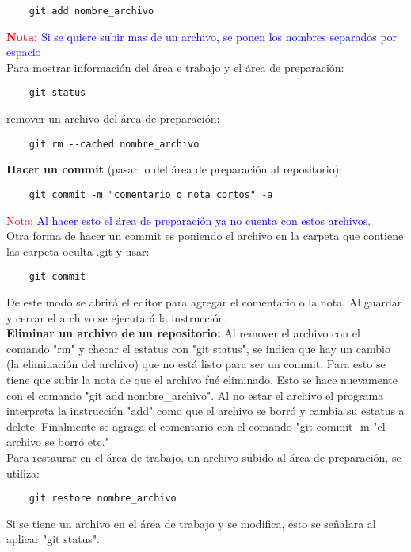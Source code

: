 \documentclass[10pt,oneside]{article}
\begin{document}
\begin{multicols}{2}
\begin{verbatim}
    git add nombre_archivo
\end{verbatim}
\textbf{\textcolor{red}{Nota:}} \textcolor{blue}{Si se quiere subir mas de un archivo, se ponen los nombres separados por espacio}\\ \newline
Para mostrar información del área e trabajo y el área de preparación:
\begin{verbatim}
    git status
\end{verbatim}
remover un archivo del área de preparación:
\begin{verbatim}
    git rm --cached nombre_archivo
\end{verbatim}
\textbf{Hacer un commit} (pasar lo del área de preparación al repositorio):
\begin{verbatim}
    git commit -m "comentario o nota cortos" -a
\end{verbatim}
\textcolor{red}{Nota:} \textcolor{blue}{Al hacer esto el área de preparación ya no cuenta con estos archivos.} \\ \newline
Otra forma de hacer un commit es poniendo el archivo en la carpeta que contiene las carpeta oculta .git y usar:
\begin{verbatim}
    git commit
\end{verbatim}
De este modo se abrirá el editor para agregar el comentario o la nota. Al guardar y cerrar el archivo se ejecutará la instrucción. \\\newline
\textbf{Eliminar un archivo de un repositorio:} Al remover el archivo con el comando "rm" y checar el estatus con "git status", se indica que hay un cambio (la eliminación del archivo) que no está listo para ser un commit. Para esto se tiene que subir la nota de que el archivo fué eliminado. Esto se hace nuevamente con el comando "git add nombre\_archivo". Al no estar el archivo el programa interpreta la instrucción "add" como que el archivo se borró y cambia su estatus a delete. Finalmente se agraga el comentario con el comando "git commit -m "el archivo se borró etc."\\ \newline
Para restaurar en el área de trabajo,  un archivo subido al área de preparación, se utiliza: \begin{verbatim}
    git restore nombre_archivo
\end{verbatim}
Si se tiene un archivo en el área de trabajo y se modifica, esto se señalara al aplicar "git status". \\\newline


\end{multicols}
\end{document}
